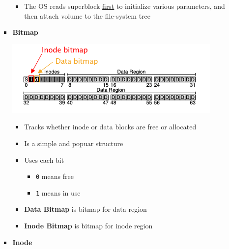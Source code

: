 \documentclass[12pt]{article}
\begin{document}
\begin{enumerate}[1.]
\begin{enumerate}[a)]
\begin{itemize}
\begin{itemize}
                \item The OS reads superblock \underline{first} to initialize various parameters,
                and then attach volume to the file-system tree
            \end{itemize}

            \item \textbf{Bitmap}

            \begin{center}
            \includegraphics[width=\linewidth]{images/midterm_1_solution_10.png}
            \end{center}

            \begin{itemize}
                \item Tracks whether inode or data blocks are free or allocated
                \item Is a simple and popuar structure
                \item Uses each bit
                \begin{itemize}
                    \item \texttt{0} means free
                    \item \texttt{1} means in use
                \end{itemize}

                \item \textbf{Data Bitmap} is bitmap for data region
                \item \textbf{Inode Bitmap} is bitmap for inode region
            \end{itemize}

            \item \textbf{Inode}


\end{itemize}
\end{enumerate}
\end{enumerate}
\end{document}
